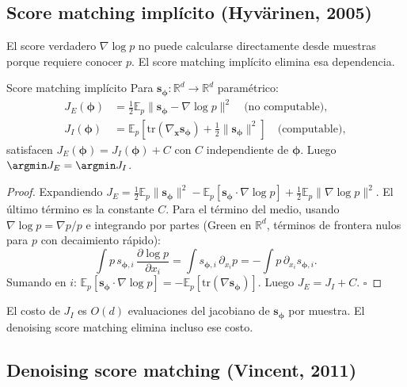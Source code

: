 \subsection{Score matching implícito (Hyvärinen, 2005)}
\label{subsec:hyvarinen}

El score verdadero $\nabla\log p$ no puede calcularse directamente desde
muestras porque requiere conocer $p$. El score matching implícito elimina esa
dependencia.

\begin{teorema}{Score matching implícito}
\label{thm:hyvarinen}
Para $\bm{s}_{\bm{\phi}}: \mathbb{R}^d\to\mathbb{R}^d$ paramétrico:
\begin{align}
  J_E(\bm{\phi}) &= \tfrac{1}{2}\mathbb{E}_p\|\bm{s}_{\bm{\phi}}-\nabla\log p\|^2
  \quad\text{(no computable)}, \label{eq:jsm_e}\\
  J_I(\bm{\phi}) &= \mathbb{E}_p\!\left[\mathrm{tr}(\nabla_{\bm{x}}\bm{s}_{\bm{\phi}})
  + \tfrac{1}{2}\|\bm{s}_{\bm{\phi}}\|^2\right]
  \quad\text{(computable)}, \label{eq:jsm_i}
\end{align}
satisfacen $J_E(\bm{\phi}) = J_I(\bm{\phi}) + C$ con $C$ independiente de
$\bm{\phi}$. Luego $\argmin J_E = \argmin J_I$.
\end{teorema}

\begin{proof}
Expandiendo $J_E = \frac{1}{2}\mathbb{E}_p\|\bm{s}_{\bm{\phi}}\|^2
- \mathbb{E}_p[\bm{s}_{\bm{\phi}}\cdot\nabla\log p]
+ \frac{1}{2}\mathbb{E}_p\|\nabla\log p\|^2$.
El último término es la constante $C$. Para el término del medio,
usando $\nabla\log p = \nabla p/p$ e integrando por partes (Green en
$\mathbb{R}^d$, términos de frontera nulos para $p$ con decaimiento rápido):
\[
  \int p\,s_{\bm{\phi},i}\,\frac{\partial\log p}{\partial x_i}
  = \int s_{\bm{\phi},i}\,\partial_{x_i}p
  = -\int p\,\partial_{x_i}s_{\bm{\phi},i}.
\]
Sumando en $i$: $\mathbb{E}_p[\bm{s}_{\bm{\phi}}\cdot\nabla\log p]
= -\mathbb{E}_p[\mathrm{tr}(\nabla\bm{s}_{\bm{\phi}})]$.
Luego $J_E = J_I + C$. $\square$
\end{proof}

El costo de $J_I$ es $O(d)$ evaluaciones del jacobiano de $\bm{s}_{\bm{\phi}}$
por muestra. El denoising score matching elimina incluso ese costo.

\subsection{Denoising score matching (Vincent, 2011)}
\label{subsec:dsm}

